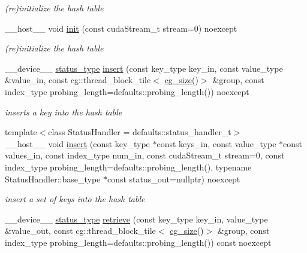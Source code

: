 \begin{DoxyCompactItemize}
\begin{DoxyCompactList}\small\item\em (re)initialize the hash table \end{DoxyCompactList}\item 
\+\_\+\+\_\+host\+\_\+\+\_\+ void \hyperlink{classwarpcore_1_1SingleValueHashTable_aa8c524865ee78bb6c2a2ffdc35078b0b}{init} (const cuda\+Stream\+\_\+t stream=0) noexcept
\begin{DoxyCompactList}\small\item\em (re)initialize the hash table \end{DoxyCompactList}\item 
\+\_\+\+\_\+device\+\_\+\+\_\+ \hyperlink{classwarpcore_1_1Status}{status\+\_\+type} \hyperlink{classwarpcore_1_1SingleValueHashTable_abd60992f9e6418a2ca792a6058aa2dab}{insert} (const key\+\_\+type key\+\_\+in, const value\+\_\+type \&value\+\_\+in, const cg\+::thread\+\_\+block\+\_\+tile$<$ \hyperlink{classwarpcore_1_1SingleValueHashTable_aaa4cf7e3252a0b177101fca437e5309e}{cg\+\_\+size}()$>$ \&group, const index\+\_\+type probing\+\_\+length=defaults\+::probing\+\_\+length()) noexcept
\begin{DoxyCompactList}\small\item\em inserts a key into the hash table \end{DoxyCompactList}\item 
{\footnotesize template$<$class Status\+Handler  = defaults\+::status\+\_\+handler\+\_\+t$>$ }\\\+\_\+\+\_\+host\+\_\+\+\_\+ void \hyperlink{classwarpcore_1_1SingleValueHashTable_a2357961d8bc78e26f7b3cf735b46a2f6}{insert} (const key\+\_\+type $\ast$const keys\+\_\+in, const value\+\_\+type $\ast$const values\+\_\+in, const index\+\_\+type num\+\_\+in, const cuda\+Stream\+\_\+t stream=0, const index\+\_\+type probing\+\_\+length=defaults\+::probing\+\_\+length(), typename Status\+Handler\+::base\+\_\+type $\ast$const status\+\_\+out=nullptr) noexcept
\begin{DoxyCompactList}\small\item\em insert a set of keys into the hash table \end{DoxyCompactList}\item 
\+\_\+\+\_\+device\+\_\+\+\_\+ \hyperlink{classwarpcore_1_1Status}{status\+\_\+type} \hyperlink{classwarpcore_1_1SingleValueHashTable_afce6914392f7c69c7ca5501b123cf167}{retrieve} (const key\+\_\+type key\+\_\+in, value\+\_\+type \&value\+\_\+out, const cg\+::thread\+\_\+block\+\_\+tile$<$ \hyperlink{classwarpcore_1_1SingleValueHashTable_aaa4cf7e3252a0b177101fca437e5309e}{cg\+\_\+size}()$>$ \&group, const index\+\_\+type probing\+\_\+length=defaults\+::probing\+\_\+length()) const noexcept

\end{DoxyCompactItemize}
